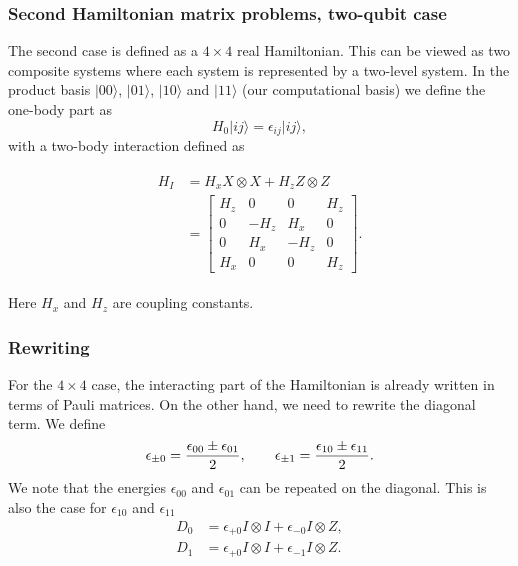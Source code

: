 \documentclass{beamer}
\begin{document}
\begin{frame}
\frametitle{Second Hamiltonian matrix problems, two-qubit case}

The second case is defined as a $4 \times 4$ real Hamiltonian.
This can be viewed as two  composite systems where each system is represented by a two-level system. In the product basis $\vert 00\rangle$, $\vert 01\rangle$, $\vert 10\rangle$ and $\vert 11\rangle$ (our computational basis)
we define the one-body part as 
\[
    H_0 \vert ij \rangle = \epsilon_{ij}\vert ij\rangle, 
\]
with a two-body interaction defined as

\begin{align*}
    \begin{split} 
        H_I &= H_x X \otimes X + H_z Z \otimes Z \\
        &= \begin{bmatrix}
            H_z & 0 & 0 & H_z \\
            0 & - H_z & H_x & 0 \\
            0 & H_x & - H_z & 0 \\
            H_x & 0 & 0 & H_z
        \end{bmatrix}.
    \end{split}
\end{align*}

Here $H_x$ and $H_z$ are coupling constants.
\end{frame}

\begin{frame}
\frametitle{Rewriting}

For the $4 \times 4$ case, the interacting part of the
Hamiltonian is already
written in terms of Pauli matrices. On the other hand, we need to rewrite the diagonal term.
We define
\begin{align*}
    \epsilon_{\pm 0} = \frac{\epsilon_{00}\pm\epsilon_{01}}{2},\hspace{20px}\epsilon_{\pm 1} = \frac{\epsilon_{10}\pm\epsilon_{11}}{2}.
\end{align*}
We note that the energies $\epsilon_{00}$ and $\epsilon_{01}$ can be repeated on the diagonal. This is also the case for $\epsilon_{10}$ and $\epsilon_{11}$
\begin{align*}
    D_{0} &= \epsilon_{+0} I\otimes I + \epsilon_{-0} I\otimes Z, \\
    D_{1} &= \epsilon_{+0} I\otimes I + \epsilon_{-1} I\otimes Z.
\end{align*}
\end{frame}
\end{document}

